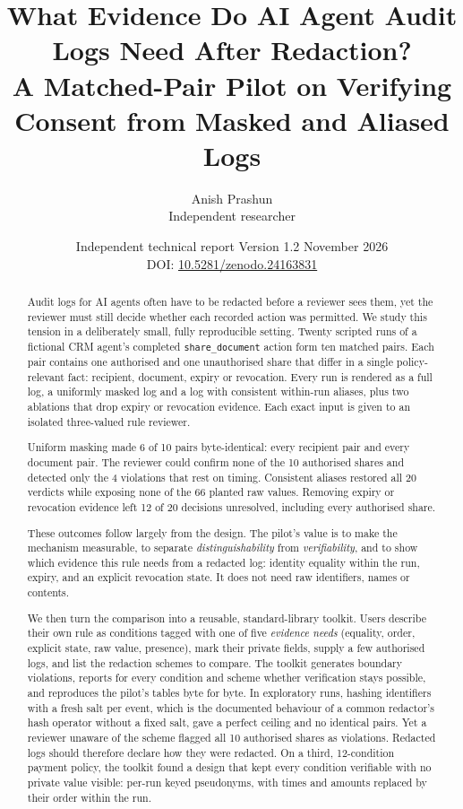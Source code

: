 \documentclass[11pt]{article}
\title{What Evidence Do AI Agent Audit Logs Need After Redaction?\\[4pt]
\large A Matched-Pair Pilot on Verifying Consent from Masked and Aliased Logs}
\author{Anish Prashun\\ \small Independent researcher}
\date{Independent technical report \quad Version 1.2 \quad November 2026\\[2pt] \small DOI: \href{https://doi.org/10.5281/zenodo.24163831}{10.5281/zenodo.24163831}}
\newcommand{\code}[1]{\texttt{#1}}
\begin{document}
\maketitle

\begin{abstract}
Audit logs for AI agents often have to be redacted before a reviewer sees them, yet the reviewer must still decide whether each recorded action was permitted. We study this tension in a deliberately small, fully reproducible setting. Twenty scripted runs of a fictional CRM agent's completed \code{share\_document} action form ten matched pairs. Each pair contains one authorised and one unauthorised share that differ in a single policy-relevant fact: recipient, document, expiry or revocation. Every run is rendered as a full log, a uniformly masked log and a log with consistent within-run aliases, plus two ablations that drop expiry or revocation evidence. Each exact input is given to an isolated three-valued rule reviewer.

Uniform masking made 6 of 10 pairs byte-identical: every recipient pair and every document pair. The reviewer could confirm none of the 10 authorised shares and detected only the 4 violations that rest on timing. Consistent aliases restored all 20 verdicts while exposing none of the 66 planted raw values. Removing expiry or revocation evidence left 12 of 20 decisions unresolved, including every authorised share.

These outcomes follow largely from the design. The pilot's value is to make the mechanism measurable, to separate \emph{distinguishability} from \emph{verifiability}, and to show which evidence this rule needs from a redacted log: identity equality within the run, expiry, and an explicit revocation state. It does not need raw identifiers, names or contents.

We then turn the comparison into a reusable, standard-library toolkit. Users describe their own rule as conditions tagged with one of five \emph{evidence needs} (equality, order, explicit state, raw value, presence), mark their private fields, supply a few authorised logs, and list the redaction schemes to compare. The toolkit generates boundary violations, reports for every condition and scheme whether verification stays possible, and reproduces the pilot's tables byte for byte. In exploratory runs, hashing identifiers with a fresh salt per event, which is the documented behaviour of a common redactor's hash operator without a fixed salt, gave a perfect ceiling and no identical pairs. Yet a reviewer unaware of the scheme flagged all 10 authorised shares as violations. Redacted logs should therefore declare how they were redacted. On a third, 12-condition payment policy, the toolkit found a design that kept every condition verifiable with no private value visible: per-run keyed pseudonyms, with times and amounts replaced by their order within the run.
\end{abstract}
\end{document}
